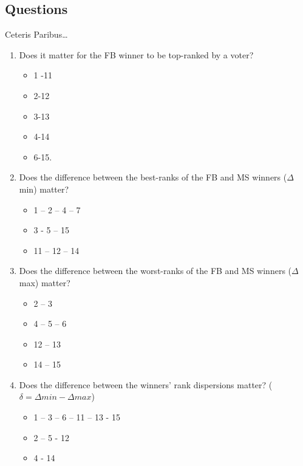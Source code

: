 \documentclass[version=3.21, pagesize, twoside=off, bibliography=totoc, DIV=calc, fontsize=12pt, a4paper]{scrartcl}
\begin{document}
\subsection{Questions}
Ceteris Paribus…
\begin{enumerate}
	\item Does it matter for the FB winner to be top-ranked by a voter? 
	\begin{itemize}
		\item 1 -11
		\item 2-12
		\item 3-13
		\item 4-14
		\item 6-15.
	\end{itemize}
	\item Does the difference between the best-ranks of the FB and MS winners  ($Δ$ min) matter?
	\begin{itemize}
		\item 1 – 2 – 4 – 7
		\item 3 -  5 – 15
		\item 11 – 12 – 14
	\end{itemize}
	\item Does the difference between the worst-ranks of the FB and MS winners  ($Δ$ max) matter?  
	\begin{itemize}
		\item 2 – 3
		\item 4 – 5 – 6
		\item 12 – 13
		\item 14 – 15
	\end{itemize}
	\item Does the difference between the winners’ rank dispersions matter? ($δ = Δmin - Δmax$)
	\begin{itemize}
		\item 1 – 3 – 6 – 11 – 13 - 15
		\item 2 – 5 - 12
		\item 4 - 14 
	\end{itemize}
\end{enumerate}

\end{document}
